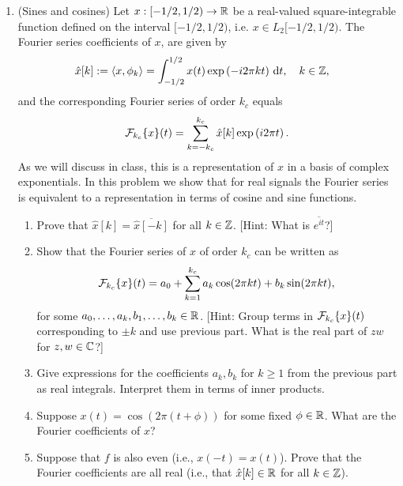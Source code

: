 \documentclass[12pt,twoside]{article}
\begin{document}
\begin{enumerate}
 \item (Sines and cosines)
  Let $x:[-1/2,1/2)\to\mathbb{R} $ be a real-valued square-integrable function defined on the interval $[-1/2,1/2)$, i.e. $x\in L_2[-1/2,1/2)$. The Fourier series coefficients of $x$, are given by
\begin{align}
\hat{x}[k] & :=  \left \langle x, \phi_k\right \rangle = \int_{-1/2}^{1/2} x(t) \exp \left( - i2 \pi k t \right)  \, \text{d}t, \quad k \in \mathbb{Z},
\end{align}
and the corresponding Fourier series of order $k_c$ equals
\begin{align}
\mathcal{ F }_{k_c}\{x\}(t) = \sum_{k=-k_c}^{k_c} \hat{x}[k] \exp \left( i 2 \pi t \right).
\end{align}
As we will discuss in class, this is a representation of $x$ in a basis of complex exponentials. In this problem we show that for real signals the Fourier series is equivalent to a representation in terms of cosine and sine functions.
  \begin{enumerate}
  \item Prove that $\hat{x}[k]=\overline{\hat{x}[-k]}$
    for all $k\in\mathbb{Z}$. [Hint: What is $\overline{e^{it}}$?]
  \item Show that the Fourier series of $x$ of order $k_c$ can be written as
    $$\mathcal{ F }_{k_c}\{x\}(t) = a_0 + \sum_{k=1}^{k_c} a_k\cos(2\pi
    kt)+b_k\sin(2\pi kt),$$
    for some $a_0,\ldots,a_k,b_1,\ldots,b_k\in\mathbb{R}$. [Hint: Group terms
      in $\mathcal{ F }_{k_c}\{x\}(t)$ corresponding to $\pm k$ and use previous
      part.  What is the real part of $zw$ for $z,w\in\mathbb{C} $?]
  \item Give
    expressions for the coefficients $a_k,b_k$ for $k\geq 1$ from the
    previous part as real integrals. Interpret them in terms of inner products.
  \item Suppose $x(t)=\cos(2\pi(t+\phi))$ for some fixed
    $\phi\in\mathbb{R}$.  What are the Fourier coefficients of $x$?
  \item Suppose that $f$ is also even (i.e., $x(-t)=x(t)$).  Prove
    that the Fourier coefficients are all real (i.e., that
    $\hat{x}[k]\in\mathbb{R}$ for all $k\in\mathbb{Z}$).
  \end{enumerate} 
   
 \end{enumerate}
\end{document}

